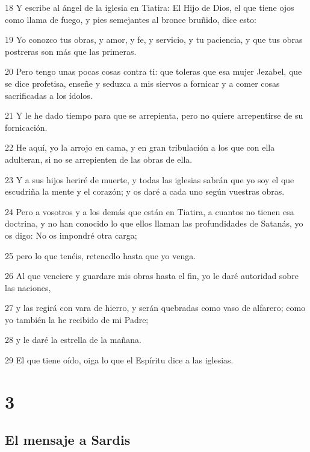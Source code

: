 \par 18 Y escribe al ángel de la iglesia en Tiatira: El Hijo de Dios, el que tiene ojos como llama de fuego, y pies semejantes al bronce bruñido, dice esto:
\par 19 Yo conozco tus obras, y amor, y fe, y servicio, y tu paciencia, y que tus obras postreras son más que las primeras.
\par 20 Pero tengo unas pocas cosas contra ti: que toleras que esa mujer Jezabel, que se dice profetisa, enseñe y seduzca a mis siervos a fornicar y a comer cosas sacrificadas a los ídolos.
\par 21 Y le he dado tiempo para que se arrepienta, pero no quiere arrepentirse de su fornicación.
\par 22 He aquí, yo la arrojo en cama, y en gran tribulación a los que con ella adulteran, si no se arrepienten de las obras de ella.
\par 23 Y a sus hijos heriré de muerte, y todas las iglesias sabrán que yo soy el que escudriña la mente y el corazón; y os daré a cada uno según vuestras obras.
\par 24 Pero a vosotros y a los demás que están en Tiatira, a cuantos no tienen esa doctrina, y no han conocido lo que ellos llaman las profundidades de Satanás, yo os digo: No os impondré otra carga;
\par 25 pero lo que tenéis, retenedlo hasta que yo venga.
\par 26 Al que venciere y guardare mis obras hasta el fin, yo le daré autoridad sobre las naciones,
\par 27 y las regirá con vara de hierro, y serán quebradas como vaso de alfarero; como yo también la he recibido de mi Padre;
\par 28 y le daré la estrella de la mañana.
\par 29 El que tiene oído, oiga lo que el Espíritu dice a las iglesias.

\chapter{3}

\section*{El mensaje a Sardis}

